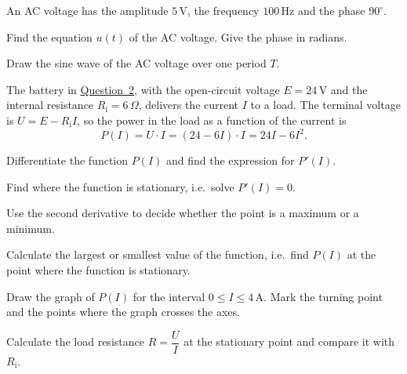 An AC voltage has the amplitude $5\,\text{V}$, the frequency $100\,\text{Hz}$ and the phase
$90^{\circ}$.
\begin{parts}
  \item Find the equation $u(t)$ of the AC voltage. Give the phase in radians.
  \item Draw the sine wave of the AC voltage over one period $T$.
\end{parts}

The battery in \hyperref[ot:u:2]{Question~2}, with the open-circuit voltage $E = 24\,\text{V}$
and the internal resistance $R_{\text{i}} = 6\,\Omega$, delivers the current $I$ to a load. The
terminal voltage is $U = E - R_{\text{i}} I$, so the power in the load as a function of the
current is
\[
  P(I) = U \cdot I = (24 - 6I) \cdot I = 24I - 6I^2.
\]
\begin{parts}
  \item Differentiate the function $P(I)$ and find the expression for $P'(I)$.
  \item Find where the function is stationary, i.e.\ solve $P'(I) = 0$.
  \item Use the second derivative to decide whether the point is a maximum or a minimum.
  \item Calculate the largest or smallest value of the function, i.e.\ find $P(I)$ at the point
    where the function is stationary.
  \item Draw the graph of $P(I)$ for the interval $0 \leq I \leq 4\,\text{A}$. Mark the turning
    point and the points where the graph crosses the axes.
  \item Calculate the load resistance $R = \dfrac{U}{I}$ at the stationary point and compare it
    with $R_{\text{i}}$.
\end{parts}


